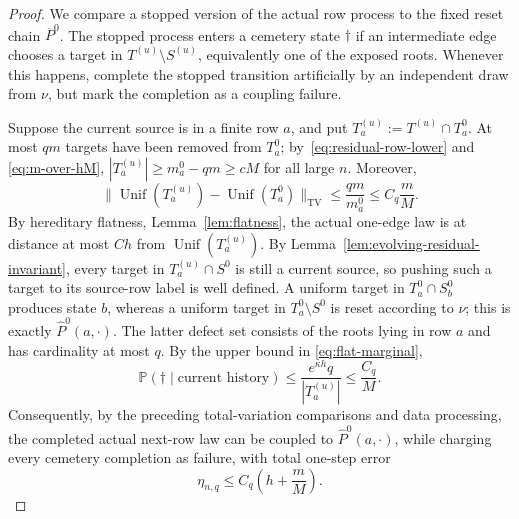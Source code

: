 \documentclass[11pt]{article}
\newcommand{\Pp}{\mathbb P}
\newcommand{\1}{\mathbf 1}
\newcommand{\TV}{\mathrm{TV}}
\newcommand{\Unif}{\operatorname{Unif}}
\theoremstyle{definition}
\theoremstyle{remark}
\begin{document}
\begin{proof}
We compare a stopped version of the actual row process to the fixed reset
chain $\overline P^0$.  The stopped process enters a cemetery state
$\dagger$ if an intermediate edge chooses a target in
$T^{(u)}\setminus S^{(u)}$, equivalently one of the exposed roots.
Whenever this happens, complete the stopped transition artificially by
an independent draw from $\nu$, but mark the completion as a coupling
failure.

Suppose the current source is in a finite row $a$, and put
$T_a^{(u)}:=T^{(u)}\cap T_a^0$.  At most $qm$ targets have been removed
from $T_a^0$; by~\eqref{eq:residual-row-lower} and
\eqref{eq:m-over-hM},
$|T_a^{(u)}|\geq m_a^0-qm\geq cM$ for all large $n$.  Moreover,
\[
  \|\Unif(T_a^{(u)})-\Unif(T_a^0)\|_{\TV}
  \leq \frac{qm}{m_a^0}\leq C_q\frac mM.
\]
By hereditary flatness, Lemma~\ref{lem:flatness}, the actual one-edge law
is at distance at most $Ch$ from $\Unif(T_a^{(u)})$.  By
Lemma~\ref{lem:evolving-residual-invariant}, every target in
$T_a^{(u)}\cap S^0$ is still a current source, so pushing such a target
to its source-row label is well defined.  A uniform target in
$T_a^0\cap S_b^0$ produces state $b$, whereas a uniform target in
$T_a^0\setminus S^0$ is reset according to $\nu$; this is exactly
$\widehat P^0(a,\cdot)$.  The latter defect set consists of the roots
lying in row $a$ and has cardinality at most $q$.  By the upper bound in
\eqref{eq:flat-marginal},
\[
  \Pp(\dagger\mid\text{current history})
  \leq \frac{e^{\kappa h}q}{|T_a^{(u)}|}
  \leq \frac{C_q}{M}.
\]
Consequently, by the preceding total-variation comparisons and data
processing, the completed actual next-row law can be coupled to
$\widehat P^0(a,\cdot)$, while charging every cemetery completion as
failure, with total one-step error
\begin{equation}\label{eq:one-step-adaptive-error}
  \eta_{n,q}\leq C_q\left(h+\frac mM\right).
\end{equation}


\end{proof}
\end{document}
